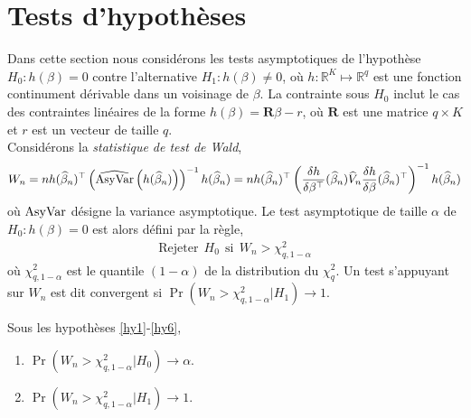 \documentclass[12pt, reqno]{amsart}
\begin{document}
\section{Tests d'hypothèses}
Dans cette section nous considérons les tests asymptotiques de l'hypothèse $H_0: h(\beta) = 0$ contre l'alternative 
 $H_1: h(\beta) \neq 0$, où $h: \mathbb{R}^K \mapsto \mathbb{R}^q$ est une fonction continument dérivable dans un voisinage de $\beta$. La contrainte sous $H_0$ inclut le cas des contraintes linéaires de la forme $h(\beta) = \mathbf{R}\beta - r$, où $\mathbf{R}$ est une matrice $q\times K$ et $r$ est un vecteur de taille $q$.\\ 
Considérons la \emph{statistique de test de Wald},
\begin{align*}
 W_n = nh(\widehat{\beta}_n)^\top \left(\widehat{\mathrm{AsyVar}}\left(h(\widehat{\beta}_n)\right)\right)^{-1}h(\widehat{\beta}_n) = n h(\widehat{\beta}_n)^\top\left(\frac{\delta h}{\delta \beta ^ \top}(\widehat{\beta}_n)\widehat{V}_n \frac{\delta h}{\delta \beta}(\widehat{\beta}_n)^\top \right)^{-1} h(\widehat{\beta}_n)
\end{align*}
où $\mathrm{AsyVar}$ désigne la variance asymptotique. Le test asymptotique de taille $\alpha$ de $H_0: h(\beta) = 0$ est alors défini par la règle,
\begin{align*}
\textrm{Rejeter} \ \ H_0 \ \ \textrm{si} \ \ W_n > \chi^2_{q, 1- \alpha}
\end{align*}
où $\chi^2_{q, 1- \alpha}$ est le quantile $(1-\alpha)$ de la distribution du $\chi^2_q$. Un test s'appuyant sur  $W_n$ est dit convergent si $\Pr(W_n > \chi^2_{q, 1- \alpha} | H_1) \rightarrow 1$.
\begin{theoreme}\label{th3}
Sous les hypothèses \ref{hy1}-\ref{hy6},
\begin{enumerate}
\item\label{th3a} $\Pr(W_n > \chi^2_{q, 1- \alpha} | H_0) \rightarrow \alpha$.
\item\label{th3b} $\Pr(W_n > \chi^2_{q, 1- \alpha} | H_1) \rightarrow 1$.
\end{enumerate}
\end{theoreme}
\end{document}
